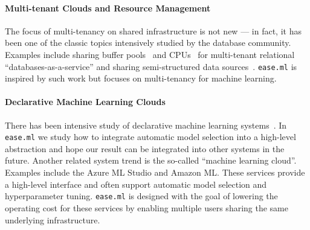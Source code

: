 \documentclass[letterpaper]{vldb}
\newcommand{\eml}{\texttt{ease.ml}\xspace}
\begin{document}
\vspace{-1em}
\paragraph*{Multi-tenant Clouds and Resource Management}
The focus of multi-tenancy on shared infrastructure is not new ---
in fact, it has been one of the classic topics intensively
studied by the database community. Examples include
sharing buffer pools~\cite{Narasayya2015} and CPUs~\cite{Das2013}
for multi-tenant relational ``databases-as-a-service''
and sharing semi-structured data sources~\cite{Bellare2013}.
\eml is inspired by such work but focuses on
multi-tenancy for machine learning.

\vspace{-1em}
\paragraph*{Declarative Machine Learning Clouds} 
There has been intensive study of declarative
machine learning systems~\cite{Boehm2016a,Meng2001,Alexandrov2015,Abadi2016,Low2012,Hellerstein:2012:VLDB,Sparks2017}. In \eml we 
study how to integrate automatic model selection into
a high-level abstraction and hope our result can be integrated
into other systems in the future.
Another related system trend is the so-called ``machine learning
cloud''. Examples include the Azure ML Studio
and Amazon ML. These services
provide a high-level interface and often support automatic model selection
and hyperparameter tuning. \eml is designed with the goal of
lowering the operating cost for these services 
by enabling multiple users sharing the same underlying 
infrastructure.


%
\end{document}
